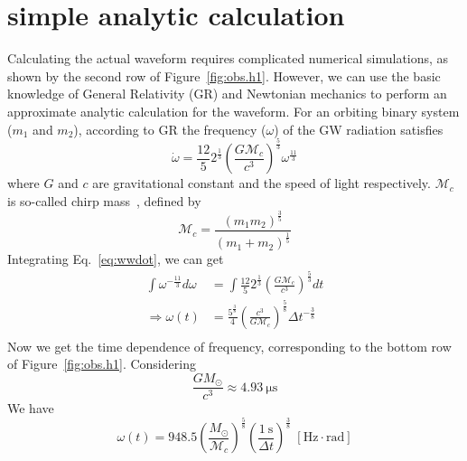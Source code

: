 \documentclass[twoside,twocolumn]{article}
\begin{document}

\section[Simple analytic calculation]{simple analytic calculation}\label{sec:analytic}
Calculating the actual waveform requires complicated numerical simulations, as shown by the second row of Figure~\ref{fig:obs.h1}. However, we can use the basic knowledge of General Relativity (GR) and Newtonian mechanics to perform an approximate analytic calculation for the waveform. For an orbiting binary system ($m_{1}$ and $m_{2}$), according to GR the frequency ($\omega$) of the GW radiation satisfies
\begin{equation}\label{eq:wwdot}
  \dot{\omega} = \frac{12}{5}2^{\frac{1}{3}}\left(\frac{G\mathcal{M}_{c}}{c^{3}}\right)^{\frac{5}{3}}\omega^{\frac{11}{3}}
\end{equation}
where $G$ and $c$ are gravitational constant and the speed of light respectively. $\mathcal{M}_{c}$ is so-called chirp mass~\cite{PhysRevLett.74.3515}, defined by
\begin{equation}\label{eq:Mc}
  \mathcal{M}_{c} = \frac{(m_{1}m_{2})^{\frac{3}{5}}}{(m_{1}+{m_{2}})^{\frac{1}{5}}}
\end{equation}
Integrating Eq.~\eqref{eq:wwdot}, we can get
\begin{equation}\label{eq:wt}
  \begin{split}
    \int\omega^{-\frac{11}{3}}d\omega &= \int\frac{12}{5}2^{\frac{1}{3}}\left(\frac{G\mathcal{M}_{c}}{c^{3}}\right)^{\frac{5}{3}}dt \\
    \Rightarrow \omega(t) &= \frac{5^{\frac{3}{8}}}{4}\left(\frac{c^{3}}{G\mathcal{M}_{c}}\right)^{\frac{5}{8}}\Delta t^{-\frac{3}{8}} \\
  \end{split}
\end{equation}
Now we get the time dependence of frequency, corresponding to the bottom row of Figure~\ref{fig:obs.h1}. Considering
\begin{equation}\label{eq:msolar}
  \frac{GM_{\odot}}{c^{3}} \approx 4.93~\mathrm{\mu s}
\end{equation}
We have
\begin{equation}\label{eq:wtnum}
  \omega(t) = 948.5\left(\frac{M_{\odot}}{\mathcal{M}_{c}}\right)^{\frac{5}{8}}\left(\frac{1\:\mathrm{s}}{\Delta t}\right)^{\frac{3}{8}}\;\mathrm{[Hz\cdot rad]}
\end{equation}
\end{document}

